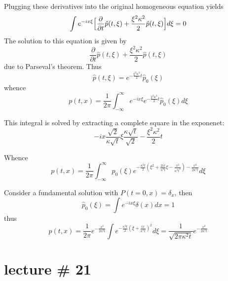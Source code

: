 \documentclass[a4paper]{article}
\begin{document}
Plugging these derivatives into the original homogeneous equation yields
\[ \int e^{-i x \xi} \Bigl[ \frac{\partial}{\partial t} \hat{p}(t,\xi) + \frac{\xi^2\kappa^2}{2} \hat{p}(t,\xi) \Bigr] d\xi = 0 \]
The solution to this equation is given by 
\[ \frac{\partial}{\partial t} \hat{p}(t,\xi) + \frac{\xi^2\kappa^2}{2} \hat{p}(t,\xi) \]
due to Parseval's theorem. Thus
\[ \hat{p}(t,\xi) = e^{-\frac{\xi^2\kappa^2}{2} t} \hat{p}_0(\xi) \]
whence
\[ p(t,x) = \frac{1}{2\pi} \int_{-\infty}^\infty e^{-i x \xi} e^{-\frac{\xi^2 \kappa^2}{2} t} \hat{p}_0(\xi) d\xi \]

This integral is solved by extracting a complete square in the exponenet:
\[
-i x \frac{\sqrt{2}}{\kappa\sqrt{t}} \xi \frac{\kappa\sqrt{t}}{\sqrt{2}} - \frac{\xi^2 \kappa^2}{2} t
\]

Whence
\[
p(t,x) = \frac{1}{2\pi} \int_{-\infty}^\infty \hat{p}_0(\xi) 
e^{ -\frac{\kappa^2 t}{2} (\xi^2 + \frac{2ix}{\kappa^2 t}\xi - \frac{x^2}{\kappa^4 t^2}) - \frac{x^2}{2\kappa^2 t}}
 d\xi
 \]


Consider a fundamental solution with $P(t=0,x) = \delta_x$, then
\[
\hat{p}_0(\xi)
= \int e^{-ix\xi} \delta(x) dx
= 1
\]
thus 
\[
p(t,x)
= \frac{1}{2\pi} e^{ - \frac{x^2}{2\kappa^2 t}}
  \int e^{ -\frac{\kappa^2 t}{2} (\xi + \frac{ix}{\kappa^2 t})^2} d\xi
= \frac{1}{\sqrt{ 2\pi \kappa^2 t} } e^{ - \frac{x^2}{2\kappa^2 t}}
\]





\section{lecture \# 21} %
\label{sec:lecture_21}



\end{document}
